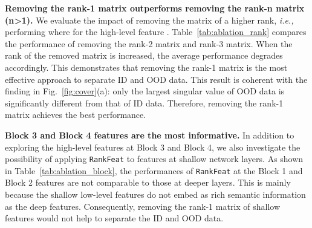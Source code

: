 \noindent \textbf{Removing the rank-1 matrix outperforms removing the rank-n matrix (n>1).} We evaluate the impact of removing the matrix of a higher rank, \emph{i.e.,} performing  where  for the high-level feature . Table~\ref{tab:ablation_rank} compares the performance of removing the rank-2 matrix and rank-3 matrix. When the rank of the removed matrix is increased, the average performance degrades accordingly. This demonstrates that removing the rank-1 matrix is the most effective approach to separate ID and OOD data. This result is coherent with the finding in Fig.~\ref{fig:cover}(a): only the largest singular value of OOD data is significantly different from that of ID data. Therefore, removing the rank-1 matrix achieves the best performance.  

\begin{table}[htbp]
    \caption{The ablation study on applying \texttt{RankFeat} to features at different network depths.} \centering
    \label{tab:ablation_block}
\end{table}

\noindent \textbf{Block 3 and Block 4 features are the most informative.} In addition to exploring the high-level features at Block 3 and Block 4, we also investigate the possibility of applying \texttt{RankFeat} to features at shallow network layers. As shown in Table~\ref{tab:ablation_block}, the performances of \texttt{RankFeat} at the Block 1 and Block 2 features are not comparable to those at deeper layers. This is mainly because the shallow low-level features do not embed as rich semantic information as the deep features. Consequently, removing the rank-1 matrix of shallow features would not help to separate the ID and OOD data. 







